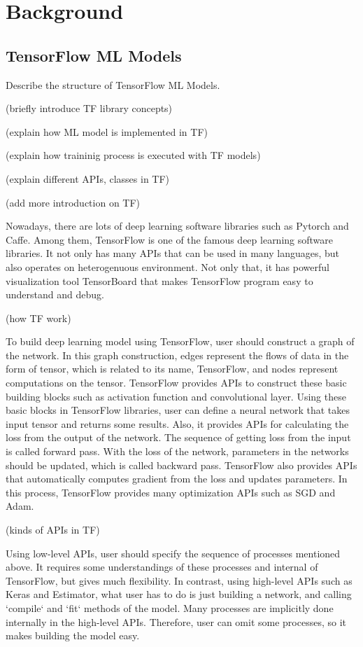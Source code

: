 \section{Background}\label{sec:background}
\subsection{TensorFlow ML Models}
Describe the structure of TensorFlow ML Models.

(briefly introduce TF library concepts)

(explain how ML model is implemented in TF)

(explain how traininig process is executed with TF models)

(explain different APIs, classes in TF)


(add more introduction on TF)

Nowadays, there are lots of deep learning software libraries
such as Pytorch and Caffe.
Among them, TensorFlow is one of the famous deep learning software libraries.
It not only has many APIs that can be used in many languages,
but also operates on heterogenuous environment\cite{199317}.
Not only that, it has powerful visualization tool TensorBoard
that makes TensorFlow program easy to understand and debug.

(how TF work\cite{doi:10.3102/1076998619872761})

To build deep learning model using TensorFlow,
user should construct a graph of the network.
In this graph construction, edges represent the flows of data in the form of tensor,
which is related to its name, TensorFlow,
and nodes represent computations on the tensor.
TensorFlow provides APIs to construct these basic building blocks
such as activation function and convolutional layer.
Using these basic blocks in TensorFlow libraries, user can define a neural network
that takes input tensor and returns some results.
Also, it provides APIs for calculating the loss from the output of the network.
The sequence of getting loss from the input is called forward pass.
With the loss of the network, parameters in the networks should be updated,
which is called backward pass.
TensorFlow also provides APIs that automatically computes gradient from the loss
and updates parameters.
In this process, TensorFlow provides many optimization APIs
such as SGD and Adam.

(kinds of APIs in TF\cite{doi:10.3102/1076998619872761})

Using low-level APIs, user should specify the sequence of processes mentioned above.
It requires some understandings of these processes and internal of TensorFlow,
but gives much flexibility.
In contrast, using high-level APIs such as Keras and Estimator,
what user has to do is just building a network,
and calling `compile` and `fit` methods of the model.
Many processes are implicitly done internally in the high-level APIs.
Therefore, user can omit some processes, so it makes building the model easy.


